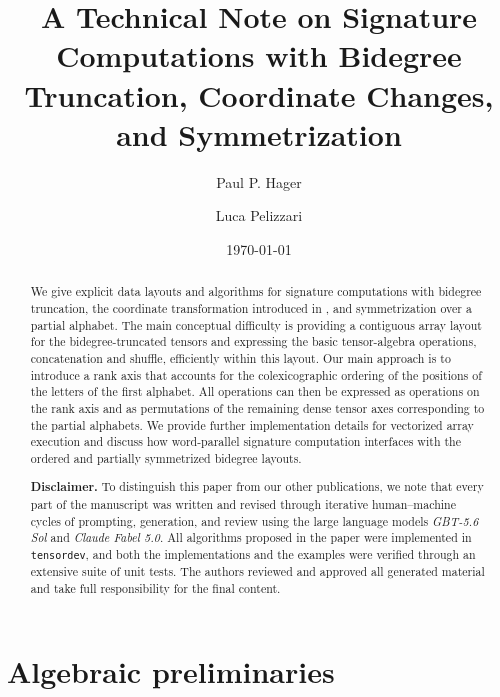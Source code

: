 \documentclass{amsart}
\theoremstyle{definition}
\theoremstyle{remark}
\begin{document}
\title[Signature Computations with Bidegree Truncation]
{A Technical Note on Signature Computations with Bidegree Truncation,
Coordinate Changes, and Symmetrization}
\author{Paul P. Hager \and Luca Pelizzari}
\date{\today}

\begin{abstract}
We give explicit data layouts and algorithms for signature computations with
bidegree truncation, the coordinate transformation introduced in
\cite{mainpaper}, and symmetrization over a partial alphabet.
The main conceptual difficulty is providing a contiguous array layout for
the bidegree-truncated tensors and expressing the basic tensor-algebra
operations, concatenation and shuffle, efficiently within this layout.
Our main approach is to introduce a rank axis that accounts for the
colexicographic ordering of the positions of the letters of the first
alphabet.
All operations can then be expressed as operations on the rank axis and as
permutations of the remaining dense tensor axes corresponding to the partial
alphabets.
We provide further implementation details for vectorized array execution
and discuss how word-parallel signature computation interfaces with the
ordered and partially symmetrized bidegree layouts.

\par\smallskip
\noindent\textbf{Disclaimer.}
To distinguish this paper from our other publications, we note that every
part of the manuscript was written and revised through iterative
human--machine cycles of prompting, generation, and review using the large
language models \emph{GBT-5.6 Sol} and \emph{Claude Fabel 5.0}. All algorithms proposed
in the paper were implemented in \texttt{tensordev}, and both the
implementations and the examples were verified through an extensive suite
of unit tests. The authors reviewed and approved all generated material and
take full responsibility for the final content.
\end{abstract}

\maketitle

\setcounter{secnumdepth}{3}
\setcounter{tocdepth}{2}
\tableofcontents

\section{Algebraic preliminaries}\label{sec:algebraic_preliminaries}
\end{document}
